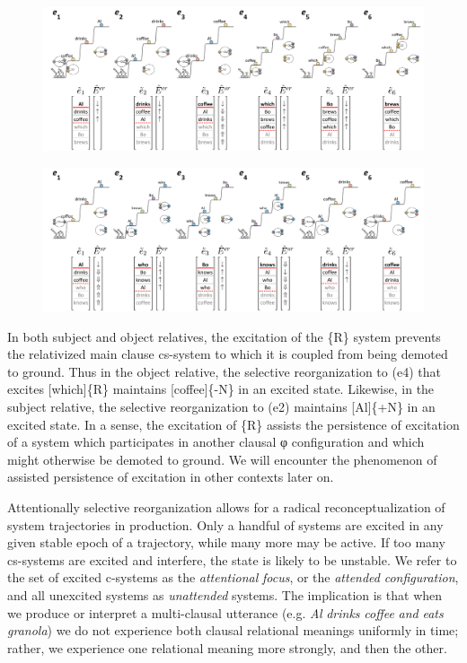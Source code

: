   
\begin{figure}
\includegraphics[width=\textwidth]{figures/Tilsen-img102.png}
\caption{\missingcaption}
\label{fig:}
\end{figure}
 

  
\begin{figure}
\includegraphics[width=\textwidth]{figures/Tilsen-img103.png}
\caption{\missingcaption}
\label{fig:}
\end{figure}
 

  In both subject and object relatives, the excitation of the \{R\} system prevents the relativized main clause cs-system to which it is coupled from being demoted to ground. Thus in the object relative, the selective reorganization to (e4) that excites [which]\{R\} maintains [coffee]\{-N\} in an excited state. Likewise, in the subject relative, the selective reorganization to (e2) maintains [Al]\{+N\} in an excited state. In a sense, the excitation of \{R\} assists the persistence of excitation of a system which participates in another clausal φ configuration and which might otherwise be demoted to ground. We will encounter the phenomenon of assisted persistence of excitation in other contexts later on.

Attentionally selective reorganization allows for a radical reconceptualization of system trajectories in production.  Only a handful of systems are excited in any given stable epoch of a trajectory, while many more may be active. If too many cs-systems are excited and interfere, the state is likely to be unstable. We refer to the set of excited c-systems as the \textit{attentional} \textit{focus}, or the \textit{attended} \textit{configuration}, and all unexcited systems as \textit{unattended} systems. The implication is that when we produce or interpret a multi-clausal utterance (e.g. \textit{Al} \textit{drinks} \textit{coffee} \textit{and} \textit{eats} \textit{granola}) we do not experience both clausal relational meanings uniformly in time; rather, we experience one relational meaning more strongly, and then the other.

